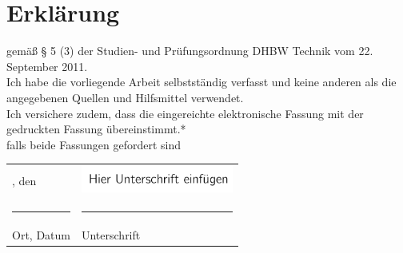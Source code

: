 \section*{Erklärung}

gemäß § 5 (3) der \glqq Studien- und Prüfungsordnung DHBW Technik\grqq{} vom 22. September 2011.\vspace*{\baselineskip}\\
Ich habe die vorliegende Arbeit selbstständig verfasst und keine anderen als die angegebenen Quellen und Hilfsmittel verwendet.\vspace*{\baselineskip}\\
Ich versichere zudem, dass die eingereichte elektronische Fassung mit der gedruckten Fassung übereinstimmt.*\vspace*{\baselineskip}\\
{\footnotesize * falls beide Fassungen gefordert sind}\\
\begin{tabularx}{\textwidth}{ll}
	\ort, den \abgabedatum & \includegraphics[width=5cm]{bilder/unterschrift.png} \\
	\rule{7cm}{1pt} & \rule{7cm}{1pt}\\
	Ort, Datum & Unterschrift
\end{tabularx}
